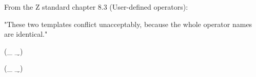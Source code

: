 From the Z standard chapter 8.3 (User-defined operators):

  "These two templates conflict unacceptably, because the whole
   operator names are identical."

\begin{zed}
 \leftassoc (\_ \d \_)
\end{zed}

\begin{zed}
 \leftassoc (\_ \d \_)
\end{zed}
